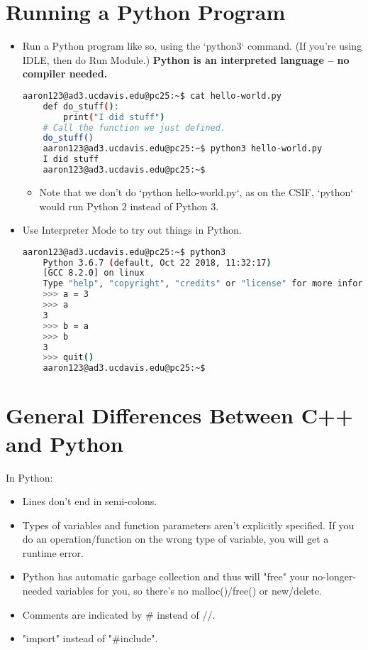 \documentclass{article}
\begin{document}
\section{Running a Python Program}
\begin{itemize}
    \item Run a Python program like so, using the `python3` command. (If you're using IDLE, then do Run Module.) \textbf{Python is an interpreted language -- no compiler needed.}
    \begin{lstlisting}[language=bash]
    aaron123@ad3.ucdavis.edu@pc25:~$ cat hello-world.py
    def do_stuff():
        print("I did stuff")
    # Call the function we just defined.
    do_stuff()
    aaron123@ad3.ucdavis.edu@pc25:~$ python3 hello-world.py
    I did stuff
    aaron123@ad3.ucdavis.edu@pc25:~$
    \end{lstlisting}
    \begin{itemize}
        \item Note that we don't do `python hello-world.py`, as on the CSIF, `python` would run Python 2 instead of Python 3.
    \end{itemize}
    \item Use Interpreter Mode to try out things in Python.
    \begin{lstlisting}[language=bash]
    aaron123@ad3.ucdavis.edu@pc25:~$ python3
    Python 3.6.7 (default, Oct 22 2018, 11:32:17)
    [GCC 8.2.0] on linux
    Type "help", "copyright", "credits" or "license" for more information.
    >>> a = 3
    >>> a
    3
    >>> b = a
    >>> b
    3
    >>> quit()
    aaron123@ad3.ucdavis.edu@pc25:~$
    \end{lstlisting}
\end{itemize}

\section{General Differences Between C++ and Python}
In Python:
\begin{itemize}
    \item Lines don't end in semi-colons.
    \item Types of variables and function parameters aren't explicitly specified. If you do an operation/function on the wrong type of variable, you will get a runtime error.
    \item Python has automatic garbage collection and thus will "free" your no-longer-needed variables for you, so there's no malloc()/free() or new/delete.
    \item Comments are indicated by \# instead of //.
    \item "import" instead of "\#include".
\end{itemize}
\end{document}
